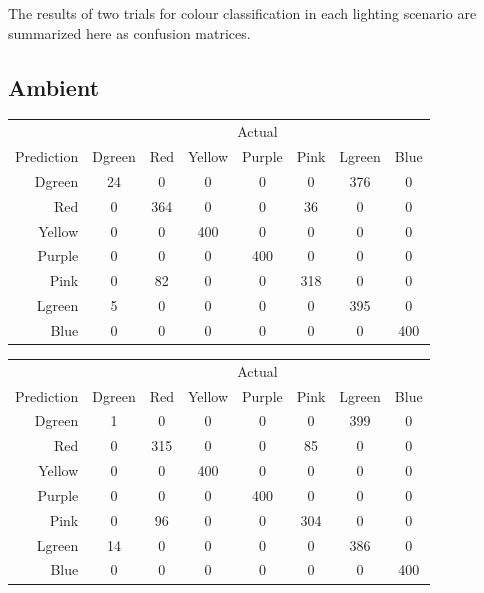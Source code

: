 \documentclass[12pt]{article}
\begin{document}




\newpage
{}
The results of two trials for colour classification in each lighting scenario are summarized here as confusion matrices. 
\subsection*{Ambient}
\begin{center}
    \begin{tabular}{r|ccccccc}
	& \multicolumn{7}{c}{Actual} \\ 
    Prediction & Dgreen & Red & Yellow & Purple & Pink & Lgreen & Blue \\ \hline
    Dgreen & 24     & 0   & 0      & 0      & 0    & 376    & 0    \\
    Red    & 0      & 364 & 0      & 0      & 36   & 0      & 0    \\
    Yellow & 0      & 0   & 400    & 0      & 0    & 0      & 0    \\
    Purple & 0      & 0   & 0      & 400    & 0    & 0      & 0    \\
    Pink   & 0      & 82  & 0      & 0      & 318  & 0      & 0    \\
    Lgreen & 5      & 0   & 0      & 0      & 0    & 395    & 0    \\
    Blue   & 0      & 0   & 0      & 0      & 0    & 0      & 400  \\
    \end{tabular}

\vspace{1em}

    \begin{tabular}{r|ccccccc}
	& \multicolumn{7}{c}{Actual} \\ 
    Prediction  & Dgreen & Red & Yellow & Purple & Pink & Lgreen & Blue \\ \hline
    Dgreen & 1      & 0   & 0      & 0      & 0    & 399    & 0    \\
    Red    & 0      & 315 & 0      & 0      & 85   & 0      & 0    \\
    Yellow & 0      & 0   & 400    & 0      & 0    & 0      & 0    \\
    Purple & 0      & 0   & 0      & 400    & 0    & 0      & 0    \\
    Pink   & 0      & 96  & 0      & 0      & 304  & 0      & 0    \\
    Lgreen & 14     & 0   & 0      & 0      & 0    & 386    & 0    \\
    Blue   & 0      & 0   & 0      & 0      & 0    & 0      & 400  \\
    \end{tabular}
\end{center}
\end{document}
